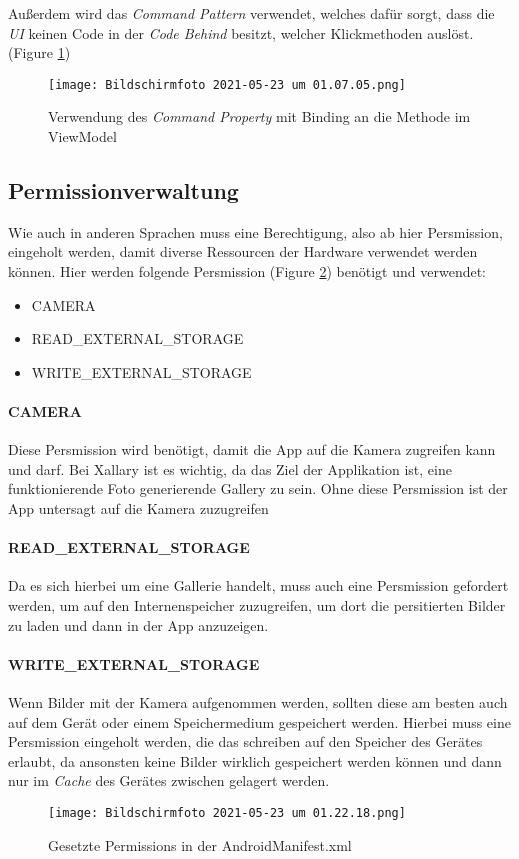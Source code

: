 \newpage
Außerdem wird das \textit{Command Pattern} verwendet, welches dafür sorgt, dass die \textit{UI} keinen Code
in der \textit{Code Behind} besitzt, welcher Klickmethoden auslöst.(Figure \ref{fig:CommandXaml})

\begin{figure}[hbt!]
    \centering
    \texttt{[image: Bildschirmfoto 2021-05-23 um 01.07.05.png]}
    \caption{Verwendung des \textit{Command Property} mit Binding an die Methode im ViewModel}
    \label{fig:CommandXaml}
\end{figure}

\subsection{Permissionverwaltung}
Wie auch in anderen Sprachen muss eine Berechtigung, also ab hier Persmission, eingeholt werden, damit diverse Ressourcen der Hardware verwendet werden können.
Hier werden folgende Persmission (Figure \ref{fig:Permissions}) benötigt und verwendet:
\begin{itemize}
    \item CAMERA
    \item READ\_EXTERNAL\_STORAGE
    \item WRITE\_EXTERNAL\_STORAGE
\end{itemize}

\paragraph{CAMERA} Diese Persmission wird benötigt, damit die App auf die Kamera zugreifen kann und darf.
Bei Xallary ist es wichtig, da das Ziel der Applikation ist, eine funktionierende Foto generierende Gallery zu sein.
Ohne diese Persmission ist der App untersagt auf die Kamera zuzugreifen

\paragraph{READ\_EXTERNAL\_STORAGE} Da es sich hierbei um eine Gallerie handelt, muss auch eine Persmission gefordert werden, um auf den Internenspeicher zuzugreifen, um dort die persitierten Bilder zu laden und dann in der App anzuzeigen.

\paragraph{WRITE\_EXTERNAL\_STORAGE} Wenn Bilder mit der Kamera aufgenommen werden, sollten diese am besten auch auf dem Gerät oder einem Speichermedium gespeichert werden. Hierbei muss eine Persmission eingeholt werden, die das schreiben auf den Speicher des Gerätes erlaubt, da ansonsten keine Bilder wirklich gespeichert werden können und dann nur im \textit{Cache} des Gerätes
zwischen gelagert werden.
\begin{figure}[hbt!]
    \centering
    \texttt{[image: Bildschirmfoto 2021-05-23 um 01.22.18.png]}
    \caption{Gesetzte Permissions in der AndroidManifest.xml}
    \label{fig:Permissions}
\end{figure}
